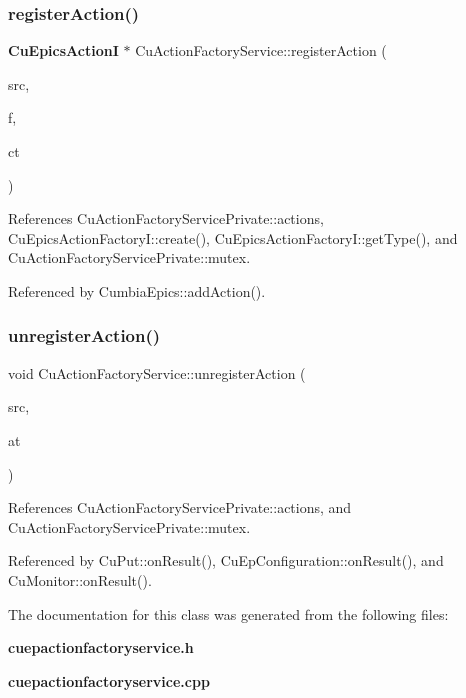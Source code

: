 \subsubsection{register\+Action()}
{\footnotesize\ttfamily \textbf{ Cu\+Epics\+ActionI} $\ast$ Cu\+Action\+Factory\+Service\+::register\+Action (\begin{DoxyParamCaption}\item[{const std\+::string \&}]{src,  }\item[{const \textbf{ Cu\+Epics\+Action\+FactoryI} \&}]{f,  }\item[{\textbf{ Cumbia\+Epics} $\ast$}]{ct }\end{DoxyParamCaption})}



References Cu\+Action\+Factory\+Service\+Private\+::actions, Cu\+Epics\+Action\+Factory\+I\+::create(), Cu\+Epics\+Action\+Factory\+I\+::get\+Type(), and Cu\+Action\+Factory\+Service\+Private\+::mutex.



Referenced by Cumbia\+Epics\+::add\+Action().

\mbox{\label{classCuActionFactoryService_adc725da0c6a8e068b76aa4daaefb5f45}} 
\subsubsection{unregister\+Action()}
{\footnotesize\ttfamily void Cu\+Action\+Factory\+Service\+::unregister\+Action (\begin{DoxyParamCaption}\item[{const std\+::string \&}]{src,  }\item[{\textbf{ Cu\+Epics\+Action\+I\+::\+Type}}]{at }\end{DoxyParamCaption})}



References Cu\+Action\+Factory\+Service\+Private\+::actions, and Cu\+Action\+Factory\+Service\+Private\+::mutex.



Referenced by Cu\+Put\+::on\+Result(), Cu\+Ep\+Configuration\+::on\+Result(), and Cu\+Monitor\+::on\+Result().



The documentation for this class was generated from the following files\+:\begin{DoxyCompactItemize}
\item 
\textbf{ cuepactionfactoryservice.\+h}\item 
\textbf{ cuepactionfactoryservice.\+cpp}\end{DoxyCompactItemize}
